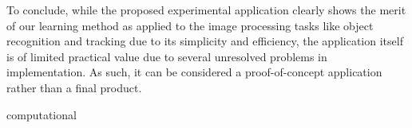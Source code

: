 To conclude, while the proposed experimental application clearly shows the merit of our learning method as applied to the image processing tasks like object recognition and tracking due to its simplicity and efficiency, the application itself is of limited practical value due to several unresolved problems in implementation. As such, it can be considered a proof-of-concept application rather than a final product. 











computational